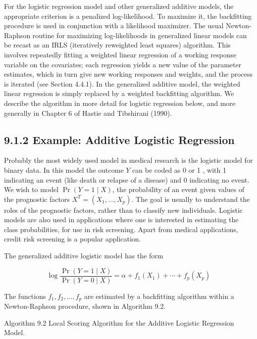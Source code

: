 \documentclass[10pt]{article}
\begin{document}
For the logistic regression model and other generalized additive models, the appropriate criterion is a penalized log-likelihood. To maximize it, the backfitting procedure is used in conjunction with a likelihood maximizer. The usual Newton-Raphson routine for maximizing log-likelihoods in generalized linear models can be recast as an IRLS (iteratively reweighted least squares) algorithm. This involves repeatedly fitting a weighted linear regression of a working response variable on the covariates; each regression yields a new value of the parameter estimates, which in turn give new working responses and weights, and the process is iterated (see Section 4.4.1). In the generalized additive model, the weighted linear regression is simply replaced by a weighted backfitting algorithm. We describe the algorithm in more detail for logistic regression below, and more generally in Chapter 6 of Hastie and Tibshirani (1990).

\subsection*{9.1.2 Example: Additive Logistic Regression}
Probably the most widely used model in medical research is the logistic model for binary data. In this model the outcome $Y$ can be coded as 0 or 1 , with 1 indicating an event (like death or relapse of a disease) and 0 indicating no event. We wish to model $\operatorname{Pr}(Y=1 \mid X)$, the probability of an event given values of the prognostic factors $X^{T}=\left(X_{1}, \ldots, X_{p}\right)$. The goal is usually to understand the roles of the prognostic factors, rather than to classify new individuals. Logistic models are also used in applications where one is interested in estimating the class probabilities, for use in risk screening. Apart from medical applications, credit risk screening is a popular application.

The generalized additive logistic model has the form


\begin{equation*}
\log \frac{\operatorname{Pr}(Y=1 \mid X)}{\operatorname{Pr}(Y=0 \mid X)}=\alpha+f_{1}\left(X_{1}\right)+\cdots+f_{p}\left(X_{p}\right) \tag{9.8}
\end{equation*}


The functions $f_{1}, f_{2}, \ldots, f_{p}$ are estimated by a backfitting algorithm within a Newton-Raphson procedure, shown in Algorithm 9.2.

Algorithm 9.2 Local Scoring Algorithm for the Additive Logistic Regression Model.
\end{document}
